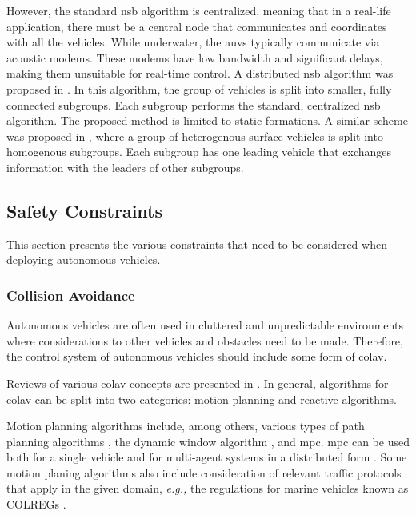 However, the standard \gls{nsb} algorithm is centralized, meaning that in a real-life application, there must be a central node that communicates and coordinates with all the vehicles.
While underwater, the \glspl{auv} typically communicate via acoustic modems.
These modems have low bandwidth and significant delays, making them unsuitable for real-time control.
A distributed \gls{nsb} algorithm was proposed in \cite{ahmad_multirobot_2014}.
In this algorithm, the group of vehicles is split into smaller, fully connected subgroups.
Each subgroup performs the standard, centralized \gls{nsb} algorithm.
The proposed method is limited to static formations.
A similar scheme was proposed in \cite{tan_coordinated_2022}, where a group of heterogenous surface vehicles is split into homogenous subgroups.
Each subgroup has one leading vehicle that exchanges information with the leaders of other subgroups.

\subsection{Safety Constraints}

This section presents the various constraints that need to be considered when deploying autonomous vehicles.

\subsubsection{Collision Avoidance}
Autonomous vehicles are often used in cluttered and unpredictable environments where considerations to other vehicles and obstacles need to be made. 
Therefore, the control system of autonomous vehicles should include some form of \gls{colav}.

Reviews of various \gls{colav} concepts are presented in \cite{statheros_autonomous_2008,tam_review_2009,hoy_algorithms_2015}.
In general, algorithms for \gls{colav} can be split into two categories: motion planning and reactive algorithms.

Motion planning algorithms include, among others, various types of path planning algorithms \cite{wang_ship_2017,kuwata_safe_2014,chiang_colreg-rrt_2018,lazarowska_ships_2015}, the dynamic window algorithm \cite{fox_dynamic_1997}, and \gls{mpc}.
\gls{mpc} can be used both for a single vehicle \cite{hagen_mpc-based_2018,sun_collision_2018} and for multi-agent systems in a distributed form \cite{kuriki_formation_2015,dai_distributed_2017}.
Some motion planing algorithms also include consideration of relevant traffic protocols that apply in the given domain, \emph{e.g.,} the regulations for marine vehicles known as COLREGs \cite{wang_ship_2017,kuwata_safe_2014,chiang_colreg-rrt_2018}.

